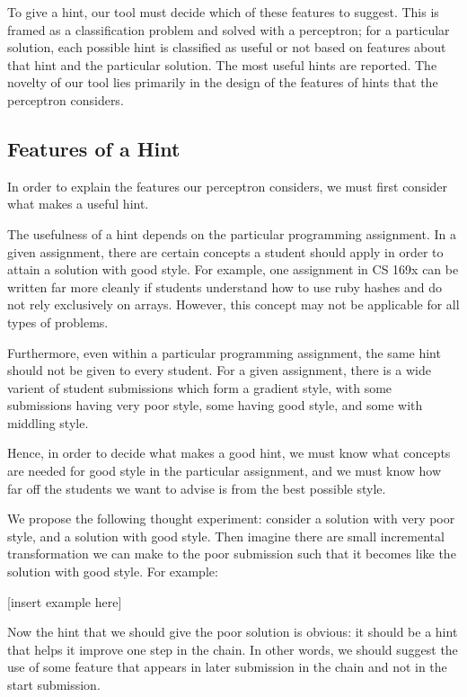 \documentclass[11pt]{article}
\begin{document}
To give a hint, our tool must decide which of these features to suggest. This is framed as a classification problem and solved with a perceptron; for a particular solution, each possible hint is classified as useful or not based on features about that hint and the particular solution. The most useful hints are reported. The novelty of our tool lies primarily in the design of the features of hints that the perceptron considers.

\subsection{Features of a Hint}

In order to explain the features our perceptron considers, we must first consider what makes a useful hint.

The usefulness of a hint depends on the particular programming assignment. In a given assignment, there are certain concepts a student should apply in order to attain a solution with good style. For example, one assignment in CS 169x can be written far more cleanly if students understand how to use ruby hashes and do not rely exclusively on arrays. However, this concept may not be applicable for all types of problems.

Furthermore, even within a particular programming assignment, the same hint should not be given to every student. For a given assignment, there is a wide varient of student submissions which form a gradient style, with some submissions having very poor style, some having good style, and some with middling style. 

Hence, in order to decide what makes a good hint, we must know what concepts are needed for good style in the particular assignment, and we must know how far off the students we want to advise is from the best possible style.

We propose the following thought experiment: consider a solution with very poor style, and a solution with good style. Then imagine there are small incremental transformation we can make to the poor submission such that it becomes like the solution with good style. For example: 

[insert example here]

Now the hint that we should give the poor solution is obvious: it should be a hint that helps it improve one step in the chain. In other words, we should suggest the use of some feature that appears in later submission in the chain and not in the start submission.
\end{document}
